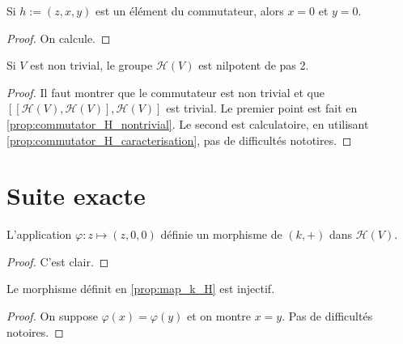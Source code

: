 \begin{proposition}
        \label{prop:commutator_H_caracterisation}
        \leanok
    
        Si $h:=(z,x,y)$ est un élément du commutateur, alors $x=0$ et $y=0$.
    \begin{proof}
        On calcule.
    \end{proof}
\end{proposition}

\begin{theorem}
    \label{thm:two_step_nil}
    \leanok

    Si $V$ est non trivial, le groupe $\mathcal{H}(V)$ est nilpotent de pas 2.
    \begin{proof}
        Il faut montrer que le commutateur est non trivial et que $[[\mathcal{H}(V),\mathcal{H}(V)],\mathcal{H}(V)]$
        est trivial. Le premier point est fait en \ref{prop:commutator_H_nontrivial}.
        Le second est calculatoire, en utilisant \ref{prop:commutator_H_caracterisation}, pas de difficultés nototires.
    \end{proof}
\end{theorem}

\section{Suite exacte}

\begin{proposition}
    \label{prop:map_k_H}
    \leanok 

    L'application $\varphi:z\mapsto (z,0,0)$ définie un morphisme de 
    $(k,+)$ dans $\mathcal{H}(V)$.
    \begin{proof}
        C'est clair.
    \end{proof}
\end{proposition}

\begin{proposition}[]
    \label{prop:inj_map_k_H}
    \leanok 

    Le morphisme définit en \ref{prop:map_k_H} est injectif.
    \begin{proof}
        On suppose $\varphi(x)=\varphi(y)$ et on montre $x=y$. Pas de 
        difficultés notoires.
    \end{proof}
\end{proposition}

